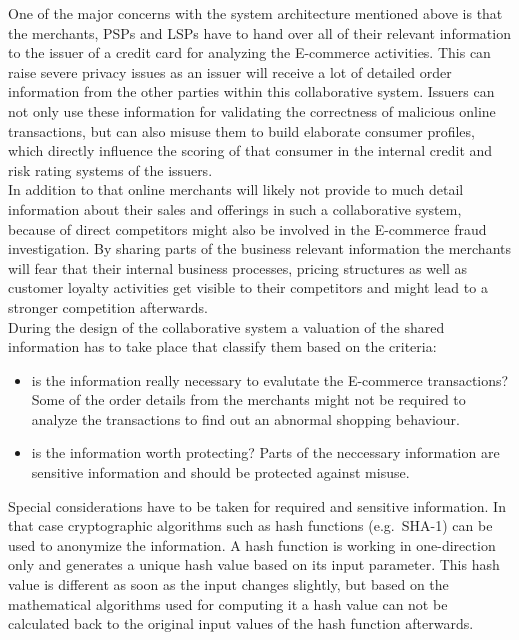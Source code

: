 One of the major concerns with the system architecture mentioned above is that the merchants, \gls{PSP}s and \gls{LSP}s have to hand over all of their relevant information to the issuer of a credit card for analyzing the \gls{E-commerce} activities. This can raise severe privacy issues as an issuer will receive a lot of detailed order information from the other parties within this collaborative system. Issuers can not only use these information for validating the correctness of malicious online transactions, but can also misuse them to build elaborate consumer profiles, which directly influence the scoring of that consumer in the internal credit and risk rating systems of the issuers. \\

In addition to that online merchants will likely not provide to much detail information about their sales and offerings in such a collaborative system, because of direct competitors might also be involved in the \gls{E-commerce} fraud investigation. By sharing parts of the business relevant information the merchants will fear that their internal business processes, pricing structures as well as customer loyalty activities get visible to their competitors and might lead to a stronger competition afterwards. \\

During the design of the collaborative system a valuation of the shared information has to take place that classify them based on the criteria: \@

\begin{itemize}
	\item is the information really necessary to evalutate the \gls{E-commerce} transactions? Some of the order details from the merchants might not be required to analyze the transactions to find out an abnormal shopping behaviour.
	\item is the information worth protecting? Parts of the neccessary information are sensitive information and should be protected against misuse.
\end{itemize}

Special considerations have to be taken for required and sensitive information. In that case cryptographic algorithms such as hash functions (e.g.\ SHA-1) can be used to anonymize the information. A hash function is working in one-direction only and generates a unique hash value based on its input parameter. This hash value is different as soon as the input changes slightly, but based on the mathematical algorithms used for computing it a hash value can not be calculated back to the original input values of the hash function afterwards. \\

